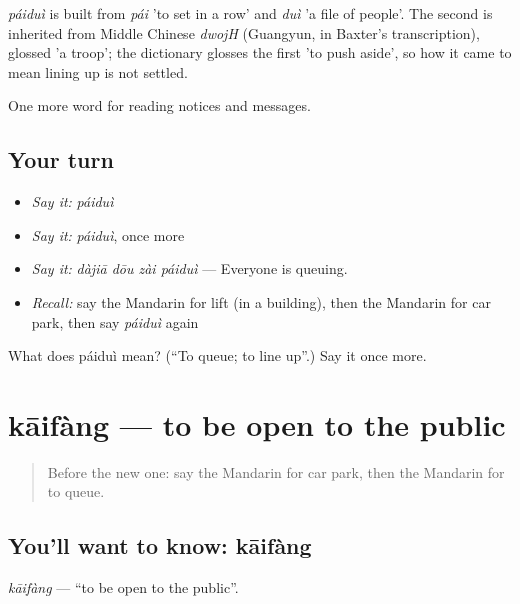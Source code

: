 \begin{cousinweb}
\emph{páiduì} is built from \emph{pái} 'to set in a row' and \emph{duì} 'a file of people'. The second is inherited from Middle Chinese \emph{dwojH} (Guangyun, in Baxter's transcription), glossed 'a troop'; the dictionary glosses the first 'to push aside', so how it came to mean lining up is not settled.
\end{cousinweb}

\begin{grammarlens}[title={What you've built}]
One more word for reading notices and messages.
\end{grammarlens}

\subsection*{Your turn}
\begin{itemize}
\raggedright
  \item \emph{Say it:} \emph{páiduì}
  \item \emph{Say it:} \emph{páiduì}, once more
  \item \emph{Say it:} \emph{dàjiā dōu zài páiduì} — Everyone is queuing.
  \item \emph{Recall:} say the Mandarin for lift (in a building), then the Mandarin for car park, then say \emph{páiduì} again
\end{itemize}

\begin{tcolorbox}[breakable,colback=teal!4,colframe=teal!35!black,title={Before you move on}]
What does páiduì mean? (\textquotedblleft{}To queue; to line up\textquotedblright{}.) Say it once more.
\end{tcolorbox}
\section[kāifàng]{kāifàng — to be open to the public}

\label{lesson:ZH-C192-kaifang}



\begin{quote}
Before the new one: say the Mandarin for car park, then the Mandarin for to queue.
\end{quote}

\subsection*{You'll want to know: kāifàng}
\emph{kāifàng} — \textquotedblleft{}to be open to the public\textquotedblright{}.

